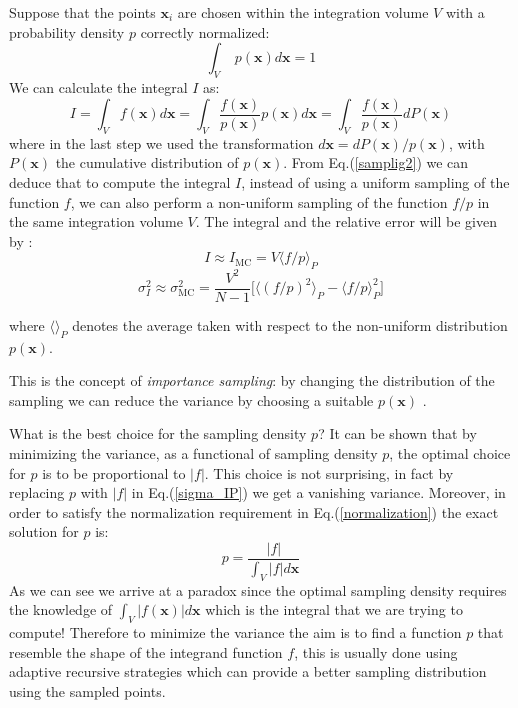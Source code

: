 \documentclass[../main/main.tex]{subfiles}
\begin{document}
Suppose that the points $\textbf{x}_i$ are chosen within the integration volume $V$ with a probability density $p$ correctly normalized:
\begin{equation}
	\label{normalization}
	\int_{V} \;  p(\textbf{x})  d \textbf{x}  = 1
\end{equation}
We can calculate the integral $I$ as:
\begin{equation}
	\label{samplig2}
	I = \int_{V}   f(\textbf{x})  d \textbf{x}  =\int_{V}   \frac{f(\textbf{x})}{ p(\textbf{x})} p(\textbf{x})  d\textbf{x}
	= \int_{V}  \frac{f(\textbf{x})}{ p(\textbf{x})} dP(\textbf{x})
\end{equation}
where in the last step we used the transformation $d\textbf{x} = dP(\textbf{x})/p(\textbf{x}) $, with $P(\textbf{x})$ the 
cumulative distribution of  $p(\textbf{x}) $.
\newline
From Eq.(\ref{samplig2}) we can deduce that to compute the integral $I$, instead of using a uniform sampling of the function $f$,
we can also perform a non-uniform sampling of the function $f/p$ in the same integration volume $V$.
\newline
The integral and the relative error will be given by \cite{unknown}:
\begin{equation}
	I \approx I_{\text{MC}}  = V \langle f/p \rangle_P
\end{equation}
\begin{equation}
	\label{sigma_IP}
	\sigma^2_I \approx \sigma^2_\text{MC} = \frac{V^2}{N-1} \bigg[\langle (f/p)^2 \rangle_P - \langle f/p \rangle^2_P \bigg]
\end{equation}


where $\langle \rangle_P$ denotes the average taken with respect to the non-uniform distribution $p(\textbf{x})$.

This is the concept of \emph{importance sampling}: by changing the distribution of the sampling we can reduce the variance by choosing
a suitable $p(\textbf{x})$ \cite{Lepage:1977sw, Lepage:2020tgj, unknown}.

What is the best choice for the sampling density $p$?
It can be shown that by minimizing the variance, as a functional of sampling density $p$, the optimal choice for $p$ is to be proportional 
to $|f|$. This choice is not surprising, in fact by replacing $p$ with $|f|$ in Eq.(\ref{sigma_IP}) we get a vanishing variance.
Moreover, in order to satisfy the normalization requirement in Eq.(\ref{normalization}) the exact solution for $p$ is:
\begin{equation}
	p = \frac{|f|}{\int_V |f| d\textbf{x}}
\end{equation}
\newline
As we can see we arrive at a paradox since the optimal sampling density requires the knowledge of $\int_V |f(\textbf{x})| d\textbf{x}$ which is the integral that we are trying to compute!
\newline
Therefore to minimize the variance the aim is to find a function $p$ that resemble the shape of the integrand function $f$, this is usually done 
using adaptive recursive strategies which can provide a better sampling distribution using the sampled points.
\end{document}
